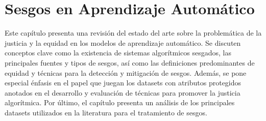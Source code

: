 \chapter{Sesgos en Aprendizaje Autom\'atico}\label{chapter:state-of-the-art}



Este cap\'itulo presenta una revisi\'on del estado del arte sobre la problem\'atica de la justicia y la equidad en los modelos de 
aprendizaje autom\'atico. Se discuten conceptos clave como la existencia de sistemas algor\'itmicos sesgados, las principales fuentes
y tipos de sesgos, as\'i como las definiciones predominantes de equidad y t\'ecnicas para la detecci\'on y mitigaci\'on de sesgos.
Adem\'as, se pone especial \'enfasis en el papel que juegan los datasets con atributos protegidos anotados en el desarrollo
y evaluaci\'on de t\'ecnicas para promover la justicia algor\'itmica. Por \'ultimo, el cap\'itulo presenta un an\'alisis de los 
principales datasets utilizados en la literatura para el tratamiento de sesgos.

